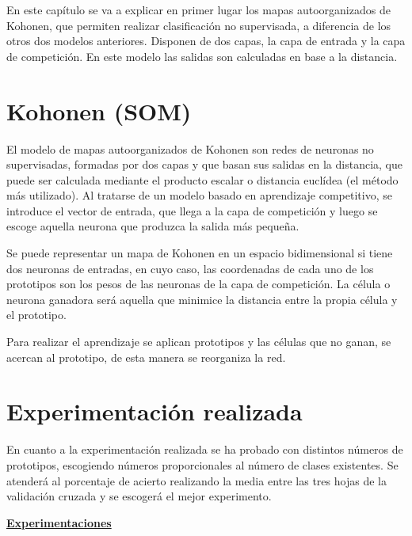 \documentclass[11pt,spanish,listoffigures,listoftables]{workluis}
\begin{document}
\par En este capítulo se va a explicar en primer lugar los mapas autoorganizados de Kohonen, que permiten realizar clasificación no supervisada, a diferencia de los otros dos modelos anteriores. Disponen de dos capas, la capa de entrada y la capa de competición. En este modelo las salidas son calculadas en base a la distancia.

\section{Kohonen (SOM)}

\par El modelo de mapas autoorganizados de Kohonen son redes de neuronas no supervisadas, formadas por dos capas y que basan sus salidas en la distancia, que puede ser calculada mediante el producto escalar o distancia euclídea (el método más utilizado). Al tratarse de un modelo basado en aprendizaje competitivo, se introduce el vector de entrada, que llega a la capa de competición y luego se escoge aquella neurona que produzca la salida más pequeña.

\par Se puede representar un mapa de Kohonen en un espacio bidimensional si tiene dos neuronas de entradas, en cuyo caso, las coordenadas de cada uno de los prototipos son los pesos de las neuronas de la capa de competición. La célula o neurona ganadora será aquella que minimice la distancia entre la propia célula y el prototipo.

\par Para realizar el aprendizaje se aplican prototipos y las células que no ganan, se acercan al prototipo, de esta manera se reorganiza la red.

\section{Experimentación realizada}

\par En cuanto a la experimentación realizada se ha probado con distintos números de prototipos, escogiendo números proporcionales al número de clases existentes. Se atenderá al porcentaje de acierto realizando la media entre las tres hojas de la validación cruzada y se escogerá el mejor experimento.


\par \underline{\textbf{Experimentaciones}}

\end{document}
